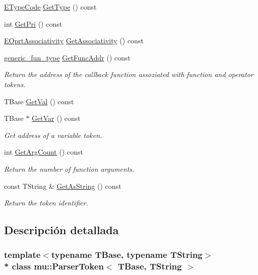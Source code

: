 \begin{DoxyCompactItemize}
\hyperlink{namespacemu_ac3ccf6a749baacffd48fe97b9c2af302}{E\+Type\+Code} \hyperlink{classmu_1_1_parser_token_a8b53010c2405da2908ad3b889798f92a}{Get\+Type} () const 
\item 
int \hyperlink{classmu_1_1_parser_token_a5b032bb1b4b3f4bfc4908e96a33733bc}{Get\+Pri} () const 
\item 
\hyperlink{namespacemu_aff435b0c277f66041374f93a3803e1f1}{E\+Oprt\+Associativity} \hyperlink{classmu_1_1_parser_token_a9d782f32f8c553271627e55300dbc07a}{Get\+Associativity} () const 
\item 
\hyperlink{namespacemu_ae289766395042975b51dda382cccc907}{generic\+\_\+fun\+\_\+type} \hyperlink{classmu_1_1_parser_token_acd1dc5d9680562db1fcd5ca2bf6add85}{Get\+Func\+Addr} () const 
\begin{DoxyCompactList}\small\item\em Return the address of the callback function assoziated with function and operator tokens. \end{DoxyCompactList}\item 
T\+Base \hyperlink{classmu_1_1_parser_token_a92bdbe69e20244358ff7b8348cee4162}{Get\+Val} () const 
\item 
T\+Base $\ast$ \hyperlink{classmu_1_1_parser_token_ae3125d176cc8c5238ec2d650386f449c}{Get\+Var} () const 
\begin{DoxyCompactList}\small\item\em Get address of a variable token. \end{DoxyCompactList}\item 
int \hyperlink{classmu_1_1_parser_token_a0286c6356dbddebca69da1e5ebb5a888}{Get\+Arg\+Count} () const 
\begin{DoxyCompactList}\small\item\em Return the number of function arguments. \end{DoxyCompactList}\item 
const T\+String \& \hyperlink{classmu_1_1_parser_token_a667a6b2a30e58bc3332ef2358412c2eb}{Get\+As\+String} () const 
\begin{DoxyCompactList}\small\item\em Return the token identifier. \end{DoxyCompactList}\end{DoxyCompactItemize}


\subsection{Descripción detallada}
\subsubsection*{template$<$typename T\+Base, typename T\+String$>$\\*
class mu\+::\+Parser\+Token$<$ T\+Base, T\+String $>$}

